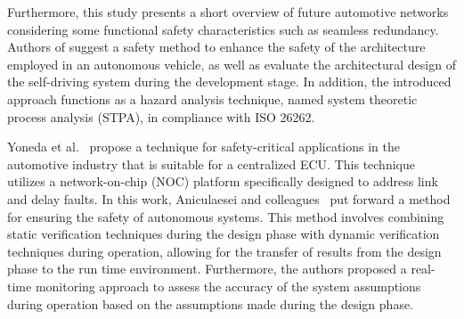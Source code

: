 Furthermore, this study presents a short overview of future automotive networks considering some functional safety characteristics such as seamless redundancy.
Authors of \cite{abdulkhaleq2017using} suggest a safety method to enhance the safety of the architecture employed in an autonomous vehicle, as well as evaluate the architectural design of the self-driving system during the development stage. In addition, the introduced approach functions as a hazard analysis technique, named system theoretic process analysis (STPA), in compliance with ISO 26262.


Yoneda et al.~\cite{yoneda2019network} propose a technique for safety-critical applications in the automotive industry that is suitable for a centralized ECU. This technique utilizes a network-on-chip (NOC) platform specifically designed to address link and delay faults.
In this work, Aniculaesei and colleagues~\cite{aniculaesei2016towards} put forward a method for ensuring the safety of autonomous systems. This method involves combining static verification techniques during the design phase with dynamic verification techniques during operation, allowing for the transfer of results from the design phase to the run time environment. Furthermore, the authors proposed a real-time monitoring approach to assess the accuracy of the system assumptions during operation based on the assumptions made during the design phase.
